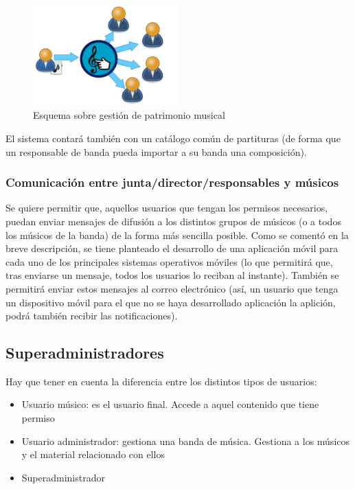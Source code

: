 \documentclass[11pt,spanish]{article}
\begin{document}
\begin{figure}[!h]
\centering
\includegraphics[width=0.5\textwidth]{img/patrimonio_musical.jpg}
\caption{Esquema sobre gestión de patrimonio musical}
\end{figure}

El sistema contará también con un catálogo común de partituras (de forma que un
responsable de banda pueda importar a su banda una composición).



\subsubsection{Comunicación entre junta/director/responsables y músicos}
Se quiere permitir que, aquellos usuarios que tengan los permisos necesarios,
puedan enviar mensajes de difusión a los distintos grupos de músicos (o a todos los
músicos de la banda) de la forma más sencilla posible.
\newline
Como se comentó en la breve descripción, se tiene
planteado el desarrollo de una aplicación móvil para cada uno de los principales
sistemas operativos móviles (lo que permitirá que, tras enviarse un mensaje, todos
los usuarios lo reciban al instante). También se permitirá enviar estos mensajes al
correo electrónico (así, un usuario que tenga un dispositivo móvil para el que no se
haya desarrollado aplicación la aplición, podrá también recibir las notificaciones).


\subsection{Superadministradores}
Hay que tener en cuenta la diferencia entre los distintos tipos de usuarios:
\begin{itemize}
  \item Usuario músico: es el usuario final. Accede a aquel contenido
  que tiene permiso
  \item Usuario administrador: gestiona una banda de música. Gestiona a los músicos y
  el material relacionado con ellos
  \item Superadministrador
\end{itemize}
\end{document}
